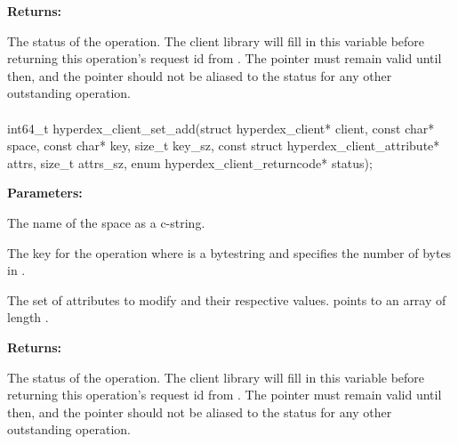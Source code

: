 \noindent\textbf{Returns:}
\begin{description}[labelindent=\widthof{{\code{status}}},leftmargin=*,noitemsep,nolistsep,align=right]
\item[\code{status}] The status of the operation.  The client library will fill in this variable before returning this operation's request id from .  The pointer must remain valid until then, and the pointer should not be aliased to the status for any other outstanding operation.
\end{description}

\paragraph{}
\begin{ccode}
int64_t hyperdex_client_set_add(struct hyperdex_client* client,
                const char* space,
                const char* key, size_t key_sz,
                const struct hyperdex_client_attribute* attrs, size_t attrs_sz,
                enum hyperdex_client_returncode* status);
\end{ccode}
\funcdesc 

\noindent\textbf{Parameters:}
\begin{description}[labelindent=\widthof{{\code{attrs}, \code{attrs\_sz}}},leftmargin=*,noitemsep,nolistsep,align=right]
\item[\code{space}] The name of the space as a c-string.
\item[\code{key}, \code{key\_sz}] The key for the operation where  is a bytestring and  specifies the number of bytes in .
\item[\code{attrs}, \code{attrs\_sz}] The set of attributes to modify and their respective values.   points to an array of length .
\end{description}

\noindent\textbf{Returns:}
\begin{description}[labelindent=\widthof{{\code{status}}},leftmargin=*,noitemsep,nolistsep,align=right]
\item[\code{status}] The status of the operation.  The client library will fill in this variable before returning this operation's request id from .  The pointer must remain valid until then, and the pointer should not be aliased to the status for any other outstanding operation.
\end{description}

